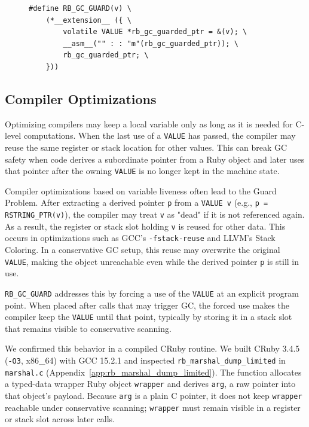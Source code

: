 \begin{figure}[tb]
\begin{lstlisting}[caption={RB\_GC\_GUARD's Definition (GCC)},label={lst:rbgcguard}]
#define RB_GC_GUARD(v) \
    (*__extension__ ({ \
        volatile VALUE *rb_gc_guarded_ptr = &(v); \
        __asm__("" : : "m"(rb_gc_guarded_ptr)); \
        rb_gc_guarded_ptr; \
    }))
\end{lstlisting}
\end{figure}

\subsection{Compiler Optimizations}\label{sec:compiler_opts}
Optimizing compilers may keep a local variable only as long as it is needed for C-level computations. When the last use of a \texttt{VALUE} has passed, the compiler may reuse the same register or stack location for other values. This can break GC safety when code derives a subordinate pointer from a Ruby object and later uses that pointer after the owning \texttt{VALUE} is no longer kept in the machine state.

Compiler optimizations based on variable liveness often lead to the Guard Problem. After extracting a derived pointer \texttt{p} from a \texttt{VALUE v} (e.g., \texttt{p = RSTRING\_PTR(v)}), the compiler may treat \texttt{v} as "dead" if it is not referenced again. As a result, the register or stack slot holding \texttt{v} is reused for other data. This occurs in optimizations such as GCC's \texttt{-fstack-reuse}\cite{gcc_fstack_reuse} and LLVM's Stack Coloring\cite{llvm_stack_coloring}. In a conservative GC setup, this reuse may overwrite the original \texttt{VALUE}, making the object unreachable even while the derived pointer \texttt{p} is still in use.

\texttt{RB\_GC\_GUARD} addresses this by forcing a use of the \texttt{VALUE} at an explicit program point. When placed after calls that may trigger GC, the forced use makes the compiler keep the \texttt{VALUE} until that point, typically by storing it in a stack slot that remains visible to conservative scanning.

We confirmed this behavior in a compiled CRuby routine. We built CRuby 3.4.5 (\texttt{-O3}, x86\_64) with GCC 15.2.1 and inspected \texttt{rb\_marshal\_dump\_limited} in \texttt{marshal.c} (Appendix~\ref{app:rb_marshal_dump_limited}). The function allocates a typed-data wrapper Ruby object \texttt{wrapper} and derives \texttt{arg}, a raw pointer into that object's payload. Because \texttt{arg} is a plain C pointer, it does not keep \texttt{wrapper} reachable under conservative scanning; \texttt{wrapper} must remain visible in a register or stack slot across later calls.

